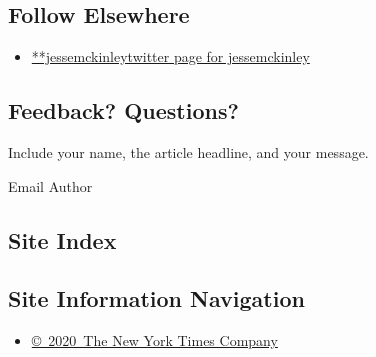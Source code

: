 \hypertarget{follow-elsewhere}{%
\subsection{Follow Elsewhere}\label{follow-elsewhere}}

\begin{itemize}
\tightlist
\item
  \href{https://twitter.com/jessemckinley}{**jessemckinleytwitter page
  for jessemckinley}
\end{itemize}

\hypertarget{feedback-questions}{%
\subsection{Feedback? Questions?}\label{feedback-questions}}

Include your name, the article headline, and your message.

Email Author

\hypertarget{site-index}{%
\subsection{Site Index}\label{site-index}}

\hypertarget{site-information-navigation}{%
\subsection{Site Information
Navigation}\label{site-information-navigation}}

\begin{itemize}
\tightlist
\item
  \href{https://help.nytimes3xbfgragh.onion/hc/en-us/articles/115014792127-Copyright-notice}{©~2020~The
  New York Times Company}
\end{itemize}

